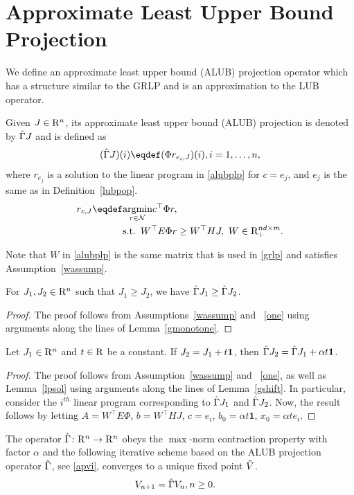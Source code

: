\section{Approximate Least Upper Bound Projection}\label{sec:alubp}
We define an approximate least upper bound (ALUB) projection operator which has a structure similar to the GRLP and is an approximation to the LUB operator.
\begin{definition}\label{alubpop}
Given $J\in \mathrm{R}^n$, its approximate least upper bound (ALUB) projection is denoted by $\hat{\Gamma} J$ and is defined as 
\begin{align}\label{tgamdef}
(\hg J)(i)\eqdef(\Phi r_{e_i,J})(i), \mb i=1,\ldots,n,
\end{align}
where $r_{e_j}$ is a solution to the linear program in \eqref{alubplp} for $c=e_j$, and $e_j$ is the same as in Definition~\ref{lubpop}.
\begin{align}\label{alubplp}
r_{c,J} \eqdef & \underset{r\in \N}{\argmin}\mb c^\top \Phi r,\nn\\
& \text{s.t.}\,\,\, W^\top E \Phi r\geq W^\top HJ,\,\, W \in \R^{nd\times m}_+ .
\end{align}
\end{definition}
Note that $W$ in \eqref{alubplp} is the same matrix that is used in \eqref{grlp} and satisfies Assumption~\ref{wassump}.
\begin{lemma}\label{tgmonotone}
For $J_1, J_2\in \mathrm{R}^n$ such that $J_1\geq J_2$, we have $\hat{\Gamma} J_1\geq \hat{\Gamma} J_2$.
\end{lemma}
\begin{proof}
The proof follows from Assumptions~\ref{wassump} and ~\ref{one} using arguments along the lines of Lemma~\ref{gmonotone}.
\end{proof}
\begin{lemma}\label{tgshift}
Let $J_1\in \mathrm{R}^n$ and $t\in \mathrm{R}$ be a constant. If $J_2=J_1+t\mathbf{1}$, then $\hat{\Gamma} J_2=\hat{\Gamma} J_1+\alpha t\mathbf{1}$.
\end{lemma}
\begin{proof}
The proof follows from Assumption~\ref{wassump} and ~\ref{one}, as well as Lemma~\ref{lpsol} using arguments along the lines of Lemma~\ref{gshift}. In particular, consider the $i^{th}$ linear program corresponding to $\hat{\Gamma} J_1$ and $\hat{\Gamma} J_2$. Now, the result follows by letting $A=W^\top E \Phi$, $b=W^\top H J$, $c=e_i$, $b_0=\alpha t \mathbf{1}$, $x_0=\alpha t e_i$.
\end{proof}
\begin{theorem}\label{tgmaxcontra}
The operator $\hat{\Gamma} \colon \mathrm{R}^n\rightarrow \mathrm{R}^n$ obeys the $\max$-norm contraction property with factor $\alpha$ and the following iterative scheme based on the ALUB projection operator $\hat{\Gamma}$, see \eqref{apvi}, converges to a unique fixed point $\hat{V}$.
\begin{align}\label{apvi}
V_{n+1}&=\hg V_n,\mb n\geq 0.
\end{align}
\end{theorem}
